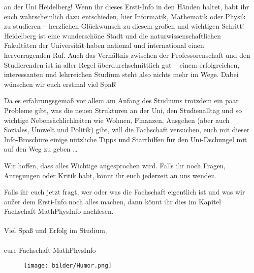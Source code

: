 an der Uni Heidelberg! Wenn ihr dieses Ersti-Info in den Händen haltet, habt ihr euch wahrscheinlich dazu entschieden, hier Informatik, Mathematik oder Physik zu studieren -- herzlichen Glückwunsch zu diesem großen und wichtigen Schritt! Heidelberg ist eine wunderschöne Stadt und die naturwissenschaftlichen Fakultäten der Universität haben national und international einen hervorragenden Ruf. Auch das Verhältnis zwischen der Professorenschaft und den Studierenden ist in aller Regel überdurchschnittlich gut -- einem erfolgreichen, interessanten und lehrreichen Studium steht also nichts mehr im Wege. Dabei wünschen wir euch erstmal viel Spaß! \smiley

Da es erfahrungsgemäß vor allem am Anfang des Studiums trotzdem ein paar Probleme gibt, was die neuen Strukturen an der Uni, den Studienalltag und so wichtige Nebensächlichkeiten wie Wohnen, Finanzen, Ausgehen (aber auch Soziales, Umwelt und Politik) gibt, will die Fachschaft versuchen, euch mit dieser Info-Broschüre einige nützliche Tipps und Starthilfen für den Uni-Dschungel mit auf den Weg zu geben \dots

\vfill


\eject

Wir hoffen, dass alles Wichtige angesprochen wird. Falls ihr noch Fragen, Anregungen oder Kritik habt, könnt ihr euch jederzeit an uns wenden.

Falls ihr euch jetzt fragt, wer oder was die Fachschaft eigentlich ist und was wir außer dem Ersti-Info noch alles machen, dann könnt ihr dies im Kapitel Fachschaft MathPhysInfo nachlesen. \\\\
\noindent Viel Spaß und Erfolg im Studium,\\\\

eure Fachschaft MathPhysInfo


\begin{figure}[b]
\centering
\texttt{[image: bilder/Humor.png]}
\end{figure}